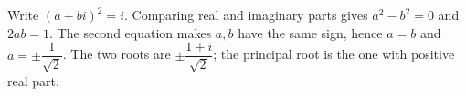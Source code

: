 Write $(a+bi)^2=i$. Comparing real and imaginary parts gives $a^2-b^2=0$ and $2ab=1$. The second equation makes $a,b$ have the same sign, hence $a=b$ and $a=\pm\dfrac{1}{\sqrt2}$. The two roots are $\boxed{\pm\dfrac{1+i}{\sqrt2}}$; the principal root is the one with positive real part.
